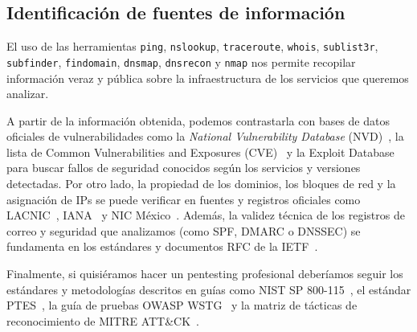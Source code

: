 \subsection*{Identificación de fuentes de información}

El uso de las herramientas \texttt{ping}, \texttt{nslookup}, \texttt{traceroute}, \texttt{whois}, \texttt{sublist3r}, \texttt{subfinder}, \texttt{findomain}, \texttt{dnsmap}, \texttt{dnsrecon} y \texttt{nmap} nos permite recopilar información veraz y pública sobre la infraestructura de los servicios que queremos analizar.

A partir de la información obtenida, podemos contrastarla con bases de datos oficiales de vulnerabilidades como la \textit{National Vulnerability Database} (NVD)~\cite{nvd_database}, la lista de Common Vulnerabilities and Exposures (CVE)~\cite{mitre_cve} y la Exploit Database~\cite{exploit_db} para buscar fallos de seguridad conocidos según los servicios y versiones detectadas. Por otro lado, la propiedad de los dominios, los bloques de red y la asignación de IPs se puede verificar en fuentes y registros oficiales como LACNIC~\cite{lacnic}, IANA~\cite{iana_root_db} y NIC México~\cite{nic_mexico}. Además, la validez técnica de los registros de correo y seguridad que analizamos (como SPF, DMARC o DNSSEC) se fundamenta en los estándares y documentos RFC de la IETF~\cite{rfc3912_whois, rfc4033_dnssec, rfc7208_spf, rfc7489_dmarc}.

Finalmente, si quisiéramos hacer un pentesting profesional deberíamos seguir los estándares y metodologías descritos en guías como NIST SP 800-115~\cite{nist_sp800_115}, el estándar PTES~\cite{ptes_standard}, la guía de pruebas OWASP WSTG~\cite{owasp_wstg} y la matriz de tácticas de reconocimiento de MITRE ATT\&CK~\cite{mitre_attack_recon}.
